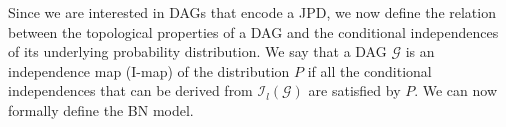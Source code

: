 
Since we are interested in DAGs that encode a JPD, we now define the relation between the topological properties of a DAG and the conditional independences  of its underlying probability distribution. We say that a DAG $\mathcal{G}$ is an independence map (I-map) of the distribution $P$ if all the conditional independences that can be derived from $\mathcal{I}_{l}(\mathcal{G})$ are satisfied by $P$. We can now formally define the BN model.

